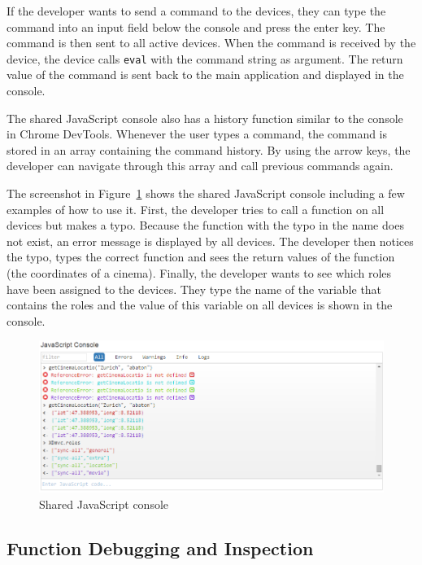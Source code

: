 If the developer wants to send a command to the devices, they can type the command into an input field below the console and press the enter key. The command is then sent to all active devices. When the command is received by the device, the device calls \lstinline|eval| with the command string as argument. The return value of the command is sent back to the main application and displayed in the console.

The shared JavaScript console also has a history function similar to the console in Chrome DevTools. Whenever the user types a command, the command is stored in an array containing the command history. By using the arrow keys, the developer can navigate through this array and call previous commands again.

The screenshot in Figure~\ref{fig:js_console} shows the shared JavaScript console including a few examples of how to use it. First, the developer tries to call a function on all devices but makes a typo. Because the function with the typo in the name does not exist, an error message is displayed by all devices. The developer then notices the typo, types the correct function and sees the return values of the function (the coordinates of a cinema). Finally, the developer wants to see which roles have been assigned to the devices. They type the name of the variable that contains the roles and the value of this variable on all devices is shown in the console.

\begin{figure}[H]
  \centering
    \includegraphics[width=1.0\textwidth]{images/screenshots/js_console_2.png}
	\caption[Screenshot: JavaScript console]{Shared JavaScript console}
	\label{fig:js_console}
\end{figure}

\subsection{Function Debugging and Inspection}

